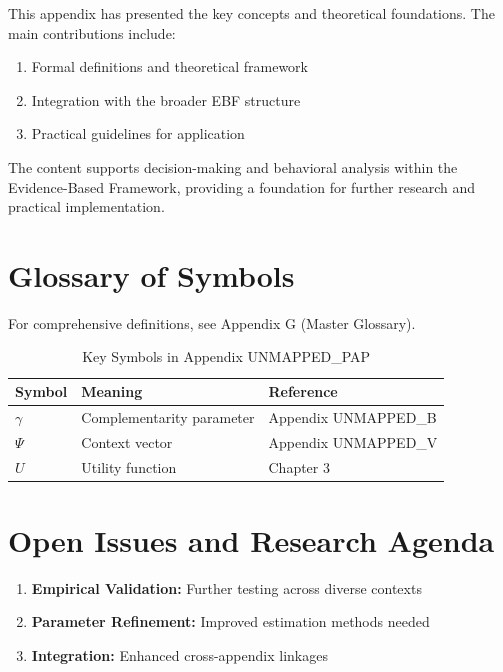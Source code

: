 This appendix has presented the key concepts and theoretical foundations.
The main contributions include:

\begin{enumerate}
    \item Formal definitions and theoretical framework
    \item Integration with the broader EBF structure
    \item Practical guidelines for application
\end{enumerate}

The content supports decision-making and behavioral analysis within the
Evidence-Based Framework, providing a foundation for further research
and practical implementation.


\section{Glossary of Symbols}
\label{sec:pap-glossary}

For comprehensive definitions, see Appendix G (Master Glossary).

\begin{table}[htbp]
\centering
\caption{Key Symbols in Appendix UNMAPPED_PAP}
\begin{tabular}{lll}
\toprule
\textbf{Symbol} & \textbf{Meaning} & \textbf{Reference} \\
\midrule
$\gamma$ & Complementarity parameter & Appendix UNMAPPED_B \\
$\Psi$ & Context vector & Appendix UNMAPPED_V \\
$U$ & Utility function & Chapter 3 \\
\bottomrule
\end{tabular}
\end{table}



\section{Open Issues and Research Agenda}
\label{sec:pap-open}

\begin{enumerate}
    \item \textbf{Empirical Validation:} Further testing across diverse contexts
    \item \textbf{Parameter Refinement:} Improved estimation methods needed
    \item \textbf{Integration:} Enhanced cross-appendix linkages
\end{enumerate}

